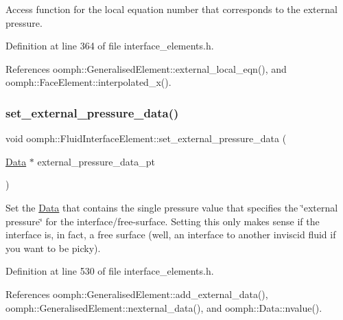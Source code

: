 Access function for the local equation number that corresponds to the external pressure. 



Definition at line 364 of file interface\+\_\+elements.\+h.



References oomph\+::\+Generalised\+Element\+::external\+\_\+local\+\_\+eqn(), and oomph\+::\+Face\+Element\+::interpolated\+\_\+x().

\mbox{\label{classoomph_1_1FluidInterfaceElement_a7230ddea36eb36938d64583e5ee4b15f}} 
\subsubsection{\texorpdfstring{set\+\_\+external\+\_\+pressure\+\_\+data()}{set\_external\_pressure\_data()}\hspace{0.1cm}{\footnotesize\ttfamily [1/2]}}
{\footnotesize\ttfamily void oomph\+::\+Fluid\+Interface\+Element\+::set\+\_\+external\+\_\+pressure\+\_\+data (\begin{DoxyParamCaption}\item[{\hyperlink{classoomph_1_1Data}{Data} $\ast$}]{external\+\_\+pressure\+\_\+data\+\_\+pt }\end{DoxyParamCaption})\hspace{0.3cm}{\ttfamily [inline]}}



Set the \hyperlink{classoomph_1_1Data}{Data} that contains the single pressure value that specifies the \char`\"{}external pressure\char`\"{} for the interface/free-\/surface. Setting this only makes sense if the interface is, in fact, a free surface (well, an interface to another inviscid fluid if you want to be picky). 



Definition at line 530 of file interface\+\_\+elements.\+h.



References oomph\+::\+Generalised\+Element\+::add\+\_\+external\+\_\+data(), oomph\+::\+Generalised\+Element\+::nexternal\+\_\+data(), and oomph\+::\+Data\+::nvalue().

